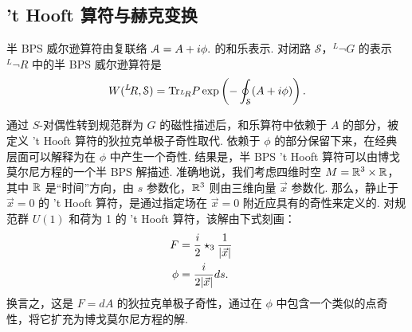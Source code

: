 \subsection{'t Hooft 算符与赫克变换}\label{thecke}

半 BPS 威尔逊算符由复联络 ${\mathcal A}=A+i\phi.$ 的和乐表示. 对闭路 $\mathcal S$，$^L\neg G$ 的表示 $^L\neg R$ 中的半 BPS 威尔逊算符是
\begin{equation}\label{wilop}W(^L\negthinspace R,\mathcal S)={\rm Tr}_{^L\negthinspace R}P\exp\left(-\oint_{\mathcal S}(A+i\phi)\right). \end{equation}

通过 $S$-对偶性转到规范群为 $G$ 的磁性描述后，和乐算符中依赖于 $A$ 的部分，被定义 't Hooft 算符的狄拉克单极子奇性取代. 依赖于 $\phi$ 的部分保留下来，在经典层面可以解释为在 $\phi$ 中产生一个奇性.
结果是，半 BPS 't Hooft 算符可以由博戈莫尔尼方程的一个半 BPS 解描述. 准确地说，我们考虑四维时空 $M={\mathbb R}^3\times {\mathbb R}$，其中 ${\mathbb R}$ 是“时间”方向，由 $s$ 参数化，${\mathbb R}^3$ 则由三维向量 $\vec x$ 参数化. 那么，静止于 $\vec x=0$ 的 't Hooft 算符，是通过指定场在 $\vec x=0$ 附近应具有的奇性来定义的.
对规范群 $U(1)$ 和荷为 1 的 't Hooft 算符，该解由下式刻画：
\begin{align}\label{charec}F & = \frac{i}{2}\star_3 \frac{1}{|\vec x|}\cr  \phi&=\frac{i}{2|\vec x|}d s. \end{align}
换言之，这是 $F=dA$ 的狄拉克单极子奇性，通过在 $\phi$ 中包含一个类似的点奇性，将它扩充为博戈莫尔尼方程的解.

